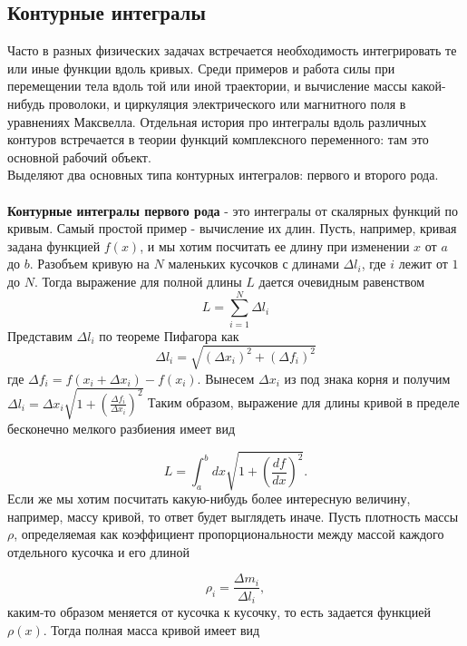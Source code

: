 \documentclass[a4paper,12pt]{article}
\begin{document}
\subsection*{Контурные интегралы}
Часто в разных физических задачах встречается необходимость интегрировать те или иные функции вдоль кривых. Среди примеров и работа силы при перемещении тела вдоль той или иной траектории, и вычисление массы какой-нибудь проволоки, и циркуляция электрического или магнитного поля в уравнениях Максвелла. Отдельная история про интегралы вдоль различных контуров встречается в теории функций комплексного переменного: там это основной рабочий объект.\\
Выделяют два основных типа контурных интегралов: первого и второго рода.\\\\
\textbf{Контурные интегралы первого рода} - это интегралы от скалярных функций по кривым. Самый простой пример - вычисление их длин. Пусть, например, кривая задана функцией $f(x)$, и мы хотим посчитать ее длину при изменении $x$ от $a$ до $b$. Разобъем кривую на $N$ маленьких кусочков с длинами $\Delta l_{i}$, где $i$ лежит от $1$ до $N$. Тогда выражение для полной длины $L$ дается очевидным равенством
\[
L	=\sum_{i=1}^{N}\Delta l_{i}
\]
Представим $\Delta l_{i}$ по теореме Пифагора как
\[
\Delta l_{i}	=\sqrt{\left(\Delta x_{i}\right)^{2}+\left(\Delta f_{i}\right)^{2}}
\]
где $\Delta f_{i}=f(x_{i}+\Delta x_{i})-f(x_{i})$. Вынесем $\Delta x_{i}$ из под знака корня и получим
$\Delta l_{i}	=\Delta x_{i}\sqrt{1+\left(\frac{\Delta f_{i}}{\Delta x_{i}}\right)^{2}}$
\noindent
Таким образом, выражение для длины кривой в пределе бесконечно мелкого разбиения имеет вид

\[
L	=\int_{a}^{b}dx\sqrt{1+\left(\frac{df}{dx}\right)^{2}}.
\]
Если же мы хотим посчитать какую-нибудь более интересную величину, например, массу кривой, то ответ будет выглядеть иначе. Пусть плотность массы $\rho$, определяемая как коэффициент пропорциональности между массой каждого отдельного кусочка и его длиной

\[
\rho_{i}	=\frac{\Delta m_{i}}{\Delta l_{i}},
\]
каким-то образом меняется от кусочка к кусочку, то есть задается функцией $\rho(x)$. Тогда полная масса кривой имеет вид
\end{document}
